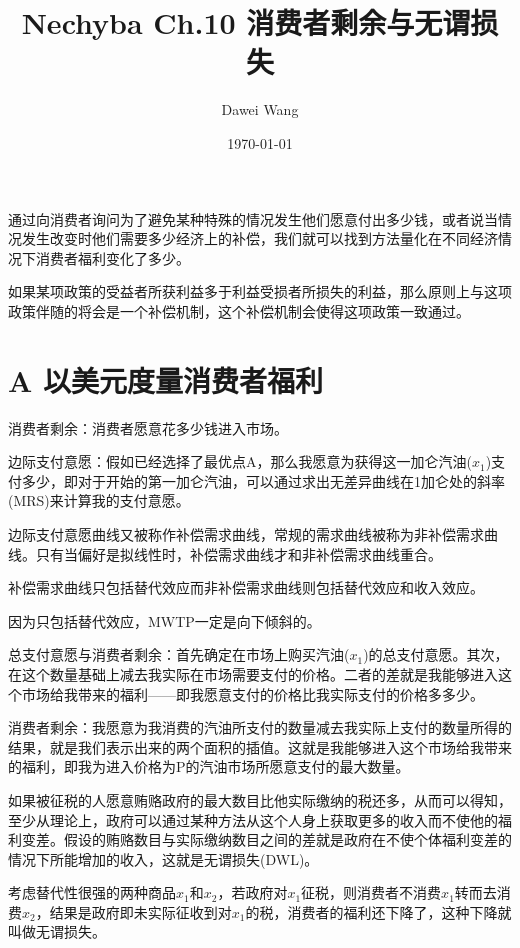 \documentclass{article}
\title{Nechyba Ch.10 消费者剩余与无谓损失}
\author{Dawei Wang}
\date{\today}
\begin{document}
	\maketitle
通过向消费者询问为了避免某种特殊的情况发生他们愿意付出多少钱，或者说当情况发生改变时他们需要多少经济上的补偿，我们就可以找到方法量化在不同经济情况下消费者福利变化了多少。

如果某项政策的受益者所获利益多于利益受损者所损失的利益，那么原则上与这项政策伴随的将会是一个补偿机制，这个补偿机制会使得这项政策一致通过。

\section{A 以美元度量消费者福利}

消费者剩余：消费者愿意花多少钱进入市场。

边际支付意愿：假如已经选择了最优点A，那么我愿意为获得这一加仑汽油($ x_1 $)支付多少，即对于开始的第一加仑汽油，可以通过求出无差异曲线在1加仑处的斜率(MRS)来计算我的支付意愿。

\hspace*{\fill}

边际支付意愿曲线又被称作补偿需求曲线，常规的需求曲线被称为非补偿需求曲线。只有当偏好是拟线性时，补偿需求曲线才和非补偿需求曲线重合。

补偿需求曲线只包括替代效应而非补偿需求曲线则包括替代效应和收入效应。

因为只包括替代效应，MWTP一定是向下倾斜的。

\hspace*{\fill}

总支付意愿与消费者剩余：首先确定在市场上购买汽油($ x_1 $)的总支付意愿。其次，在这个数量基础上减去我实际在市场需要支付的价格。二者的差就是我能够进入这个市场给我带来的福利——即我愿意支付的价格比我实际支付的价格多多少。

消费者剩余：我愿意为我消费的汽油所支付的数量减去我实际上支付的数量所得的结果，就是我们表示出来的两个面积的插值。这就是我能够进入这个市场给我带来的福利，即我为进入价格为P的汽油市场所愿意支付的最大数量。

\hspace*{\fill}

如果被征税的人愿意贿赂政府的最大数目比他实际缴纳的税还多，从而可以得知，至少从理论上，政府可以通过某种方法从这个人身上获取更多的收入而不使他的福利变差。假设的贿赂数目与实际缴纳数目之间的差就是政府在不使个体福利变差的情况下所能增加的收入，这就是无谓损失(DWL)。

考虑替代性很强的两种商品$ x_1 $和$ x_2 $，若政府对$ x_1 $征税，则消费者不消费$ x_1 $转而去消费$ x_2 $，结果是政府即未实际征收到对$ x_1 $的税，消费者的福利还下降了，这种下降就叫做无谓损失。
\end{document}

